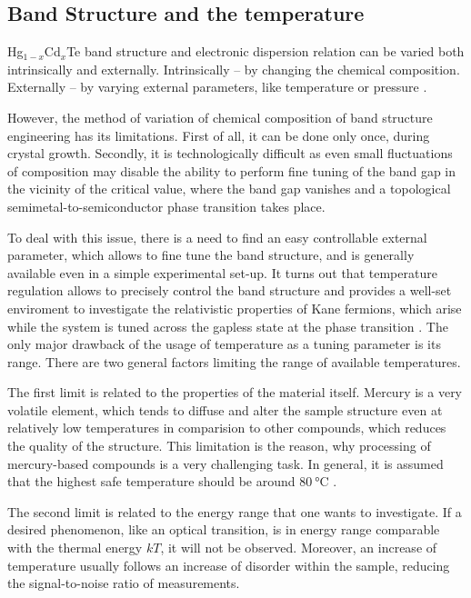 \documentclass[titlepage,a4paper]{book}
\newcommand{\wciecie}{\quad\phantom{v}}
\begin{document}
\subsection{Band Structure and the temperature}
\wciecie
Hg$_{1-x}$Cd$_x$Te band structure and electronic dispersion relation can be varied both intrinsically and externally. Intrinsically -- by changing the chemical composition. Externally -- by varying external parameters, like temperature \cite{Capper_MCT} or pressure \cite{Krishtopenko_pressure}. 

However, the method of variation of chemical composition of band structure engineering has its limitations. First of all, it can be done only once, during crystal growth. Secondly, it is technologically difficult as even small fluctuations of composition may disable the ability to perform fine tuning of the band gap in the vicinity of the critical value, where the band gap vanishes and a topological semimetal-to-semiconductor phase transition takes place.

To deal with this issue, there is a need to find an easy controllable external parameter, which allows to fine tune the band structure, and is generally available even in a simple experimental set-up. It turns out that temperature regulation allows to precisely control the band structure and provides a well-set enviroment to investigate the relativistic properties of Kane fermions, which arise while the system is tuned across the gapless state at the phase transition \cite{Teppe_MCT}. The only major drawback of the usage of temperature as a tuning parameter is its range. There are two general factors limiting the range of available temperatures. 

The first limit is related to the properties of the material itself. Mercury is a very volatile element, which tends to diffuse and alter the sample structure even at relatively low temperatures in comparision to other compounds, which reduces the quality of the structure. This limitation is the reason, why processing of mercury-based compounds is a very challenging task. In general, it is assumed that the highest safe temperature should be around $\SI{80}{\degreeCelsius}$ \cite{Daumer_MCT_temperature}.

The second limit is related to the energy range that one wants to investigate. If a desired phenomenon, like an optical transition, is in energy range comparable with the thermal energy $kT$, it will not be observed. Moreover, an increase of temperature usually follows an increase of disorder within the sample, reducing the signal-to-noise ratio of measurements.
\end{document}
